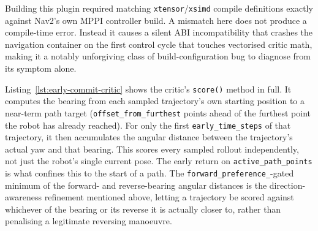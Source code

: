 Building this plugin required matching \texttt{xtensor}/\texttt{xsimd}
compile definitions exactly against Nav2's own MPPI controller build.
A mismatch here does not produce a compile-time error. Instead it
causes a silent ABI incompatibility that crashes the navigation
container on the first control cycle that touches vectorised critic
math, making it a notably unforgiving class of build-configuration
bug to diagnose from its symptom alone.

Listing~\ref{lst:early-commit-critic} shows the critic's
\texttt{score()} method in full. It computes the bearing from each
sampled trajectory's own starting position to a near-term path target
(\texttt{offset\_from\_furthest} points ahead of the furthest point
the robot has already reached). For only the first
\texttt{early\_time\_steps} of that trajectory, it then accumulates
the angular distance between the trajectory's actual yaw and that
bearing. This scores every sampled rollout independently, not just
the robot's single current pose. The early return on
\texttt{active\_path\_points} is what confines this to the start of a
path. The \texttt{forward\_preference\_}-gated minimum of the
forward- and reverse-bearing angular distances is the
direction-awareness refinement mentioned above, letting a trajectory
be scored against whichever of the bearing or its reverse it is
actually closer to, rather than penalising a legitimate reversing
manoeuvre.

